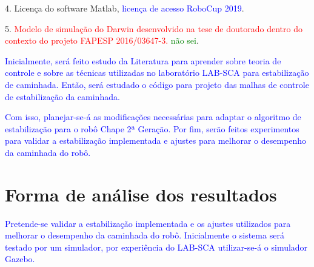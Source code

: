 4.	Licença do software Matlab, \textcolor{blue}{licença de acesso RoboCup 2019}.

5.	\textcolor{red}{Modelo de simulação do Darwin desenvolvido na tese de doutorado dentro do contexto do projeto FAPESP 2016/03647-3.} \textcolor{green}{não sei}.


\textcolor{blue}{Inicialmente, será feito estudo da Literatura para aprender sobre teoria de controle e sobre as técnicas utilizadas no laboratório LAB-SCA para estabilização de caminhada. Então, será estudado o código para projeto das malhas de controle de estabilização da caminhada.} 

\textcolor{blue}{Com isso, planejar-se-á as modificações necessárias para adaptar o algoritmo de estabilização para o robô Chape 2ª Geração. Por fim, serão feitos experimentos para validar a estabilização implementada e ajustes para melhorar o desempenho da caminhada do robô.}

\newpage





\section{Forma de análise dos resultados}

\textcolor{blue}{Pretende-se validar a estabilização implementada e os ajustes utilizados para melhorar o desempenho da caminhada do robô. Inicialmente o sistema será testado por um simulador, por experiência do LAB-SCA utilizar-se-á o simulador Gazebo.}




